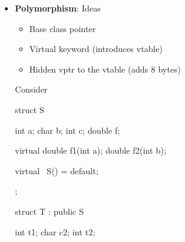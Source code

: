 \documentclass{report}
\begin{document}
\begin{itemize}
\begin{cppcode}
                    struct T : public S{
                        int t1;
                        char c2;
                        int t2;
                    };
                \end{cppcode}
                \bigbreak \noindent 
                So, since an intstance of $T$ is a instance of $S$ (with additional members), the size of the $T$ is the size of $S$ plus the size of $T - S$. In this situation, it should be clear that contiguous storage alignment / padding is dependent $S$ and $T$.
            \item \textbf{Polymorphism}: Ideas
                \begin{itemize}
                    \item Base class pointer
                    \item Virtual keyword (introduces vtable)
                    \item Hidden vptr to the vtable (adds 8 bytes)
                \end{itemize}
                Consider
                \bigbreak \noindent 
                \begin{cppcode}
                    struct S {
                        int a;
                        char b;
                        int c;
                        double f;

                        virtual double f1(int a);
                        double f2(int b);

                        virtual ~S() = default;
                    };

                    struct T : public S {
                        int t1;
                        char c2;
                        int t2;

}
\end{cppcode}
\end{itemize}
\end{document}

